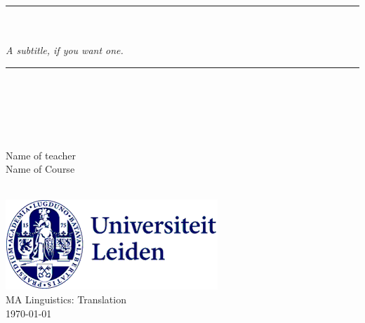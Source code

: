     \newcommand{\HRule}{\rule{\linewidth}{0.5mm}}
    
    \begin{titlepage}
\vspace*{4.5cm}

    \center
    \makeatletter
    \HRule \\[0.6cm]
    \emph{\huge \@title}\\[0.3cm] 
    \emph{\Large A subtitle, if you want one.}\\[0.3cm] 
    \HRule \\[4.5cm]
    \large
    
    \begin{minipage}{0.45\textwidth}
    	\begin{flushleft}
            \textup{\@author}\\
        \end{flushleft}
    \end{minipage}
    ~
    \begin{minipage}{0.45\textwidth}
    	\begin{flushright}
            \textup{Name of teacher} \\
            \textup{Name of Course}
        \end{flushright}
    \end{minipage}\\[3.5cm]
    
    \makeatother
    \center
    \includegraphics[width=0.2\linewidth]{leidenuni.png}\\[0.5cm]
    {\large MA Linguistics: Translation}\\[0.5cm]
    {\large \today}\\[2cm]
    
\end{titlepage}